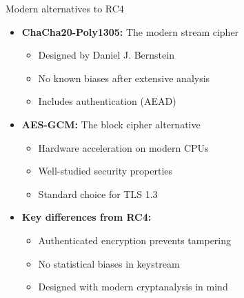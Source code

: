 \documentclass[aspectratio=169, lualatex, handout]{beamer}
\begin{document}
\begin{frame}{Modern alternatives to RC4}
	\begin{itemize}
		\item \textbf{ChaCha20-Poly1305:} The modern stream cipher
		      \begin{itemize}
			      \item Designed by Daniel J. Bernstein
			      \item No known biases after extensive analysis
			      \item Includes authentication (AEAD)
		      \end{itemize}
		\item \textbf{AES-GCM:} The block cipher alternative
		      \begin{itemize}
			      \item Hardware acceleration on modern CPUs
			      \item Well-studied security properties
			      \item Standard choice for TLS 1.3
		      \end{itemize}
		\item \textbf{Key differences from RC4:}
		      \begin{itemize}
			      \item Authenticated encryption prevents tampering
			      \item No statistical biases in keystream
			      \item Designed with modern cryptanalysis in mind
		      \end{itemize}
	\end{itemize}
\end{frame}
\end{document}
